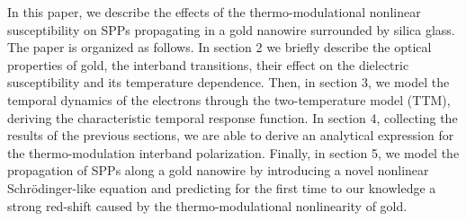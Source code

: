 \documentclass[10pt]{article}
\begin{document}
In this paper, we describe the effects of the thermo-modulational nonlinear susceptibility on SPPs propagating in a gold nanowire surrounded by silica glass. The paper is organized as follows. In section 2 we briefly describe the optical properties of gold, the interband transitions, their effect on the dielectric susceptibility and its temperature dependence. Then, in section 3, we model the temporal dynamics of the electrons through the two-temperature model (TTM), deriving the characteristic temporal response function. In section 4, collecting the results of the previous sections, we are able to derive an analytical expression for the thermo-modulation interband polarization. Finally, in section 5, we model the propagation of SPPs along a gold nanowire by introducing a novel nonlinear Schrödinger-like equation and predicting for the first time to our knowledge a strong red-shift caused by the thermo-modulational nonlinearity of gold.
\end{document}
